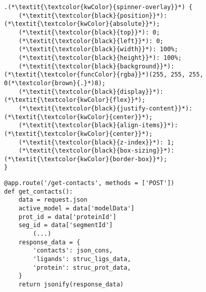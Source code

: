 \newpage

\begin{lstlisting}[language=MyCSS, caption={[CSS \texttt{spinner-overlay} class]\textbf{CSS \texttt{spinner-overlay} class.} Attributes of the \texttt{spinner-overlay} CSS class. This class is used to overlay a transparent white background to sit behind the spinner wheel that is shown while LIGYSIS-web is loading structures, reading files or performing calculations.}, label={CSS_class}]
.(*\textit{\textcolor{kwColor}{spinner-overlay}}*) {
    (*\textit{\textcolor{black}{position}}*): (*\textit{\textcolor{kwColor}{absolute}}*);
    (*\textit{\textcolor{black}{top}}*): 0;
    (*\textit{\textcolor{black}{left}}*): 0;
    (*\textit{\textcolor{black}{width}}*): 100%;
    (*\textit{\textcolor{black}{height}}*): 100%;
    (*\textit{\textcolor{black}{background}}*): (*\textit{\textcolor{funcColor}{rgba}}*)(255, 255, 255, 0(*\textcolor{brown}{.}*)8);
    (*\textit{\textcolor{black}{display}}*): (*\textit{\textcolor{kwColor}{flex}}*);
    (*\textit{\textcolor{black}{justify-content}}*): (*\textit{\textcolor{kwColor}{center}}*);
    (*\textit{\textcolor{black}{align-items}}*): (*\textit{\textcolor{kwColor}{center}}*);
    (*\textit{\textcolor{black}{z-index}}*): 1;
    (*\textit{\textcolor{black}{box-sizing}}*): (*\textit{\textcolor{kwColor}{border-box}}*);
}
\end{lstlisting}


\begin{lstlisting}[language=MyPython, abovecaptionskip=\abovecaptionskip, caption={[Python Flask \texttt{/get-contacts} route]\textbf{Python Flask \texttt{/get-contacts} route.} Simplified \texttt{/get-contacts} Python Flask route implemented in LIGYSIS-web. This route retrieves the PDB code (\texttt{modelData}) for a given structure depicting the interaction between one or multiple ligands and a protein mapping to a UniProt accession (\texttt{proteinId}) and a PDBe-KB segment (\texttt{segmentId}). Then, it reads a series of files, including pdbe-arpeggio output, processes them and returns the data in a suitable format to draw the relevant protein-ligand interactions in the 3Dmol.js viewer.}, label={get_contacts_route}]
@app.route('/get-contacts', methods = ['POST'])
def get_contacts():
    data = request.json
    active_model = data['modelData']
    prot_id = data['proteinId']
    seg_id = data['segmentId']
		(...)	
    response_data = {
        'contacts': json_cons,
        'ligands': struc_ligs_data,
        'protein': struc_prot_data,
    }
    return jsonify(response_data)
\end{lstlisting}

